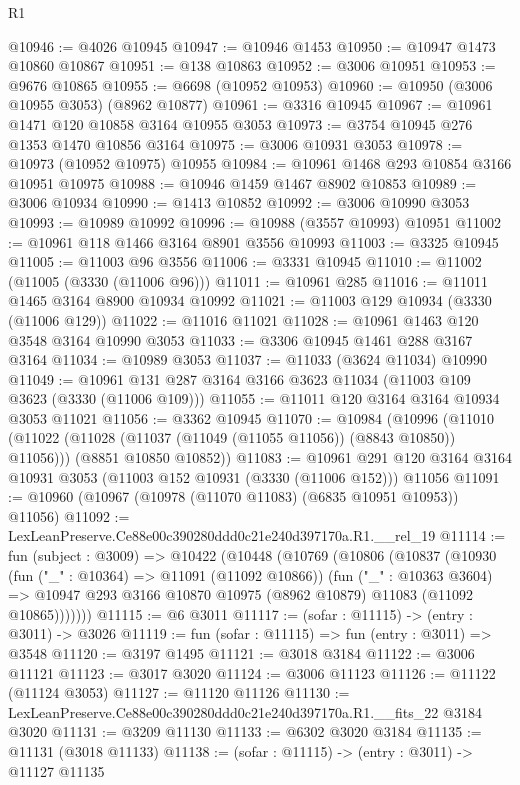 \begin{lexlean}{R1}
\begin{coremodule}
@10946 := @4026 @10945
@10947 := @10946 @1453
@10950 := @10947 @1473 @10860 @10867
@10951 := @138 @10863
@10952 := @3006 @10951
@10953 := @9676 @10865
@10955 := @6698 (@10952 @10953)
@10960 := @10950 (@3006 @10955 @3053) (@8962 @10877)
@10961 := @3316 @10945
@10967 := @10961 @1471 @120 @10858 @3164 @10955 @3053
@10973 := @3754 @10945 @276 @1353 @1470 @10856 @3164
@10975 := @3006 @10931 @3053
@10978 := @10973 (@10952 @10975) @10955
@10984 := @10961 @1468 @293 @10854 @3166 @10951 @10975
@10988 := @10946 @1459 @1467 @8902 @10853
@10989 := @3006 @10934
@10990 := @1413 @10852
@10992 := @3006 @10990 @3053
@10993 := @10989 @10992
@10996 := @10988 (@3557 @10993) @10951
@11002 := @10961 @118 @1466 @3164 @8901 @3556 @10993
@11003 := @3325 @10945
@11005 := @11003 @96 @3556
@11006 := @3331 @10945
@11010 := @11002 (@11005 (@3330 (@11006 @96)))
@11011 := @10961 @285
@11016 := @11011 @1465 @3164 @8900 @10934 @10992
@11021 := @11003 @129 @10934 (@3330 (@11006 @129))
@11022 := @11016 @11021
@11028 := @10961 @1463 @120 @3548 @3164 @10990 @3053
@11033 := @3306 @10945 @1461 @288 @3167 @3164
@11034 := @10989 @3053
@11037 := @11033 (@3624 @11034) @10990
@11049 := @10961 @131 @287 @3164 @3166 @3623 @11034 (@11003 @109 @3623 (@3330 (@11006 @109)))
@11055 := @11011 @120 @3164 @3164 @10934 @3053 @11021
@11056 := @3362 @10945
@11070 := @10984
    (@10996
      (@11010 (@11022 (@11028 (@11037 (@11049 (@11055 @11056)) (@8843 @10850)) @11056)))
      (@8851 @10850 @10852))
@11083 := @10961
    @291
    @120
    @3164
    @3164
    @10931
    @3053
    (@11003 @152 @10931 (@3330 (@11006 @152)))
    @11056
@11091 := @10960 (@10967 (@10978 (@11070 @11083) (@6835 @10951 @10953)) @11056)
@11092 := LexLeanPreserve.Ce88e00c390280ddd0c21e240d397170a.R1.__rel_19
@11114 := fun (subject : @3009) =>
  @10422
    (@10448
      (@10769
        (@10806
          (@10837
            (@10930
              (fun ("_" : @10364) => @11091 (@11092 @10866))
              (fun ("_" : @10363 @3604) =>
              @10947 @293 @3166 @10870 @10975 (@8962 @10879) @11083 (@11092 @10865)))))))
@11115 := @6 @3011
@11117 := (sofar : @11115) -> (entry : @3011) -> @3026
@11119 := fun (sofar : @11115) => fun (entry : @3011) => @3548
@11120 := @3197 @1495
@11121 := @3018 @3184
@11122 := @3006 @11121
@11123 := @3017 @3020
@11124 := @3006 @11123
@11126 := @11122 (@11124 @3053)
@11127 := @11120 @11126
@11130 := LexLeanPreserve.Ce88e00c390280ddd0c21e240d397170a.R1.__fits_22 @3184 @3020
@11131 := @3209 @11130
@11133 := @6302 @3020 @3184
@11135 := @11131 (@3018 @11133)
@11138 := (sofar : @11115) -> (entry : @3011) -> @11127 @11135

\end{coremodule}
\end{lexlean}

